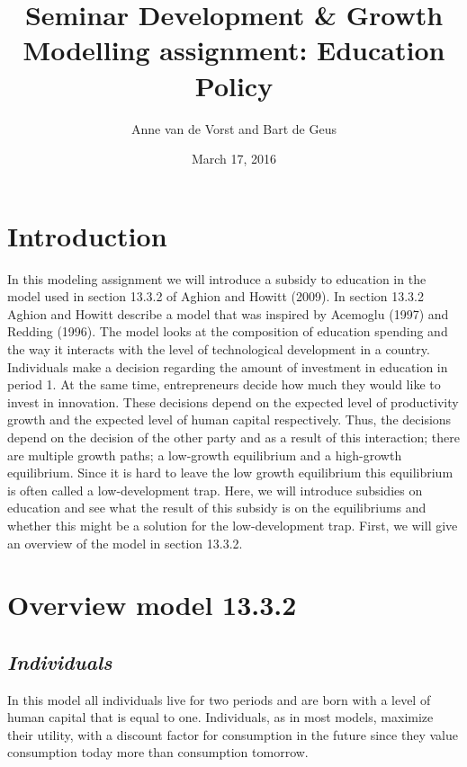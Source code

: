 \documentclass[a4paper,11pt]{article} %
\begin{document}
\title{%
  \large Seminar Development \& Growth \\
  \huge Modelling assignment: Education Policy}
\author{Anne van de Vorst and Bart de Geus}
\date{March 17, 2016}
\maketitle


\section{Introduction}
In this modeling assignment we will introduce a subsidy to education in the model used in section 13.3.2 of Aghion and Howitt (2009). In section 13.3.2 Aghion and Howitt describe a model that was inspired by Acemoglu (1997) and Redding (1996). The model looks at the composition of education spending and the way it interacts with the level of technological development in a country. Individuals make a decision regarding the amount of investment in education in period 1. At the same time, entrepreneurs decide how much they would like to invest in innovation. These decisions depend on the expected level of productivity growth and the expected level of human capital respectively. Thus, the decisions depend on the decision of the other party and as a result of this interaction; there are multiple growth paths; a low-growth equilibrium and a high-growth equilibrium. Since it is hard to leave the low growth equilibrium this equilibrium is often called a low-development trap. Here, we will introduce subsidies on education and see what the result of this subsidy is on the equilibriums and whether this might be a solution for the low-development trap. First, we will give an overview of the model in section 13.3.2.

\section{Overview model 13.3.2}
\subsection*{\textit{Individuals}} %
In this model all individuals live for two periods and are born with a level of human capital that is equal to one. Individuals, as in most models, maximize their utility, with a discount factor for consumption in the future since they value consumption today more than consumption tomorrow.
 
\end{document}
